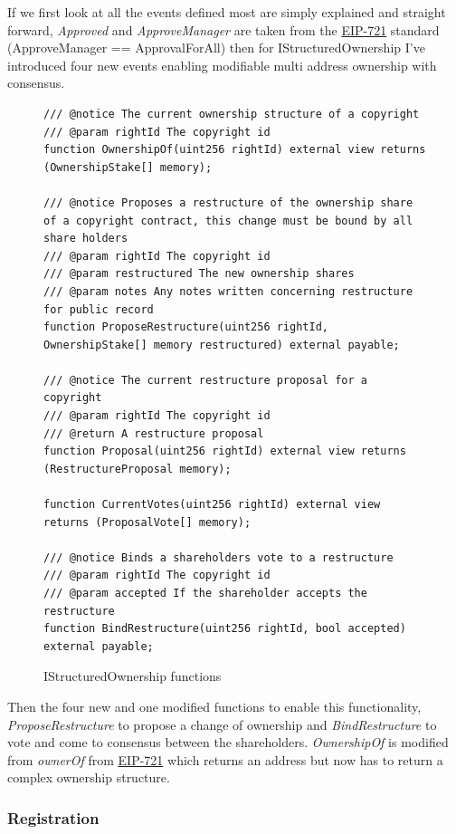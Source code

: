 \documentclass[12pt]{article}
\newcommand{\nft}[0]{\href{https://eips.ethereum.org/EIPS/eip-721}{EIP-721} }
\begin{document}
If we first look at all the events defined most are simply explained and straight forward, \textit{Approved} and \textit{ApproveManager} are taken from the \nft standard (ApproveManager == ApprovalForAll) then for IStructuredOwnership I've introduced four new events enabling modifiable multi address ownership with consensus.


\begin{figure}[H]
\caption{IStructuredOwnership functions}
\centering
\begin{lstlisting}[language=Solidity]
/// @notice The current ownership structure of a copyright
/// @param rightId The copyright id
function OwnershipOf(uint256 rightId) external view returns (OwnershipStake[] memory);

/// @notice Proposes a restructure of the ownership share of a copyright contract, this change must be bound by all share holders
/// @param rightId The copyright id
/// @param restructured The new ownership shares
/// @param notes Any notes written concerning restructure for public record
function ProposeRestructure(uint256 rightId, OwnershipStake[] memory restructured) external payable;

/// @notice The current restructure proposal for a copyright
/// @param rightId The copyright id
/// @return A restructure proposal
function Proposal(uint256 rightId) external view returns (RestructureProposal memory);
    
function CurrentVotes(uint256 rightId) external view returns (ProposalVote[] memory);

/// @notice Binds a shareholders vote to a restructure
/// @param rightId The copyright id
/// @param accepted If the shareholder accepts the restructure
function BindRestructure(uint256 rightId, bool accepted) external payable;
\end{lstlisting}
\end{figure}

Then the four new and one modified functions to enable this functionality, \textit{ProposeRestructure} to propose a change of ownership and \textit{BindRestructure} to vote and come to consensus between the shareholders. \textit{OwnershipOf} is modified from \textit{ownerOf} from \nft which returns an address but now has to return a complex ownership structure.

\subsubsection{Registration}
\end{document}
